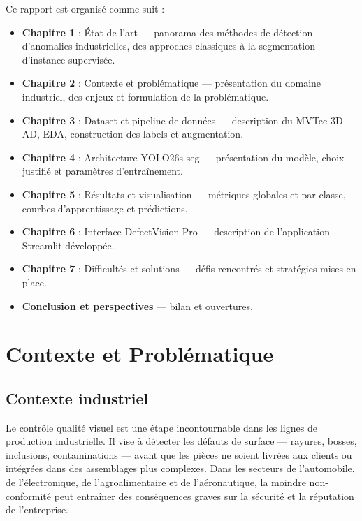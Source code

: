 \documentclass[12pt, a4paper]{report}
\begin{document}
\vspace{0.5cm}
\noindent Ce rapport est organisé comme suit :

\begin{itemize}
  \item \textbf{Chapitre 1} : État de l'art — panorama des méthodes de détection d'anomalies industrielles, des approches classiques à la segmentation d'instance supervisée.
  \item \textbf{Chapitre 2} : Contexte et problématique — présentation du domaine industriel, des enjeux et formulation de la problématique.
  \item \textbf{Chapitre 3} : Dataset et pipeline de données — description du MVTec 3D-AD, EDA, construction des labels et augmentation.
  \item \textbf{Chapitre 4} : Architecture YOLO26s-seg — présentation du modèle, choix justifié et paramètres d'entraînement.
  \item \textbf{Chapitre 5} : Résultats et visualisation — métriques globales et par classe, courbes d'apprentissage et prédictions.
  \item \textbf{Chapitre 6} : Interface DefectVision Pro — description de l'application Streamlit développée.
  \item \textbf{Chapitre 7} : Difficultés et solutions — défis rencontrés et stratégies mises en place.
  \item \textbf{Conclusion et perspectives} — bilan et ouvertures.
\end{itemize}

\newpage

\chapter{Contexte et Problématique}

\section{Contexte industriel}

Le contrôle qualité visuel est une étape incontournable dans les lignes de production industrielle. Il vise à détecter les défauts de surface — rayures, bosses, inclusions, contaminations — avant que les pièces ne soient livrées aux clients ou intégrées dans des assemblages plus complexes. Dans les secteurs de l'automobile, de l'électronique, de l'agroalimentaire et de l'aéronautique, la moindre non-conformité peut entraîner des conséquences graves sur la sécurité et la réputation de l'entreprise.
\end{document}
